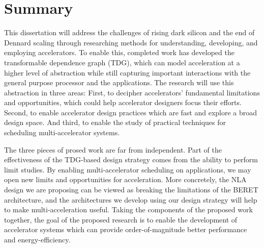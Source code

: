 \section{Summary} \label{sec:summary}
This dissertation will address the challenges of rising dark silicon 
and the end of Dennard scaling through researching methods for understanding,
developing, and employing accelerators.
To enable this, completed work has developed the transformable 
dependence graph (TDG), which can model acceleration at a higher 
level of abstraction while still capturing important
interactions with the general purpose processor and the applications.
The research will use this abstraction in three areas:  First,
to decipher accelerators'  fundamental limitations and opportunities, 
which could help accelerator designers focus their efforts.  
Second, to enable accelerator design practices which are fast and explore
a broad design space.  And third, to enable the study of practical 
techniques for scheduling multi-accelerator systems.  

The three pieces of prosed work are far from independent.  Part of the effectiveness
of the TDG-based design strategy comes from the ability to perform limit studies.  By
enabling multi-accelerator scheduling on applications, we may open new limits
and opportunities for acceleration.  More concretely, the NLA design we are proposing
can be viewed as breaking the limitations of the BERET architecture, and the
architectures we develop using our design strategy will help to make
multi-acceleration useful.  Taking the components of the proposed work together,
the goal of the proposed research is to enable the development of
accelerator systems which can provide order-of-magnitude better performance and
energy-efficiency.
